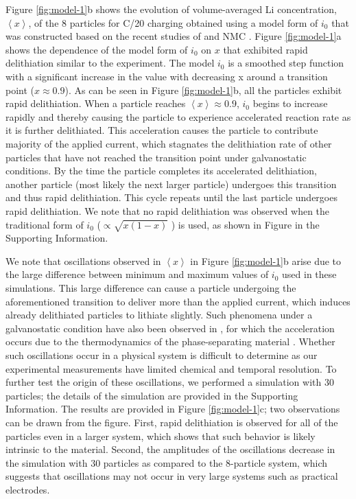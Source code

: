 \documentclass{article}
\begin{document}
Figure \ref{fig:model-1}b shows the evolution of volume-averaged Li
concentration, $\left\langle x \right\rangle$, of the 8 particles for
C/20 charging obtained using a model form of $i_0$ that was
constructed based on the recent studies of \nca{} \cite{chueh2021} and
NMC \cite{tsai2018, mukherjee2017, chiang2020}. Figure
\ref{fig:model-1}a shows the dependence of the model form of $i_0$ on
$x$ that exhibited rapid delithiation similar to the experiment. The
model $i_0$ is a smoothed step function with a significant increase in
the value with decreasing x around a transition point
($x\approx0.9$). As can be seen in Figure \ref{fig:model-1}b, all the
particles exhibit rapid delithiation. When a particle reaches
$\left\langle x\right\rangle\approx0.9$, $i_0$ begins to increase
rapidly and thereby causing the particle to experience accelerated
reaction rate as it is further delithiated. This acceleration causes
the particle to contribute majority of the applied current, which
stagnates the delithiation rate of other particles that have not
reached the transition point under galvanostatic conditions. By the
time the particle completes its accelerated delithiation, another
particle (most likely the next larger particle) undergoes this
transition and thus rapid delithiation. This cycle repeats until the
last particle undergoes rapid delithiation.  We note that no rapid
delithiation was observed when the traditional form of $i_0$
($\propto\sqrt{x(1-x)}$ \cite{newman1993, newman1994, newman1995,
  newman1996}) is used, as shown in Figure  in the Supporting
Information.

We note that oscillations observed in $\left\langle x\right\rangle$ in
Figure \ref{fig:model-1}b arise due to the large difference between
minimum and maximum values of $i_0$ used in these simulations. This
large difference can cause a particle undergoing the aforementioned
transition to deliver more than the applied current, which induces
already delithiated particles to lithiate slightly. Such phenomena
under a galvanostatic condition have also been observed in
, for which the acceleration occurs due to the
thermodynamics of the phase-separating material
\cite{thornton2015}. Whether such oscillations occur in a physical
system is difficult to determine as our experimental measurements have
limited chemical and temporal resolution. To further test the origin
of these oscillations, we performed a simulation with 30 particles;
the details of the simulation are provided in the Supporting
Information. The results are provided in Figure \ref{fig:model-1}c;
two observations can be drawn from the figure. First, rapid
delithiation is observed for all of the particles even in a larger
system, which shows that such behavior is likely intrinsic to the
material. Second, the amplitudes of the oscillations decrease in the
simulation with 30 particles as compared to the 8-particle system,
which suggests that oscillations may not occur in very large systems
such as practical electrodes.
\end{document}
